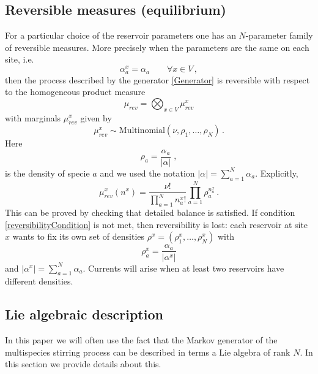 \documentclass[10pt]{article}
\numberwithin{equation}{section}
\numberwithin{equation}{subsection}
\newcommand{\co}{\;,}
\newcommand{\twoj}{\nu}
\begin{document}
\subsection{Reversible measures (equilibrium)}
For a particular choice of the reservoir parameters one has an $N$-parameter family of reversible measures. More precisely
when the parameters are the same on each site, i.e.
\begin{equation}\label{reversibilityCondition}
\alpha_{a}^{x}=\alpha_{a}\qquad \forall x\in V\,,
\end{equation}
then the process described by the generator \eqref{Generator} is reversible with respect to the 
homogeneous product measure 
\begin{equation}
\label{reversibleMeasure}
\mu_{rev}=\bigotimes_{x\in V}\mu_{rev}^{x}
\end{equation}
with marginals $\mu_{rev}^{x}$ given by 
\begin{equation}
 \mu^{x}_{rev}\sim \text{Multinomial}\left(\twoj,\rho_{1},\ldots,\rho_{N}\right)\,.
\end{equation}
Here
 $$
\rho_{a}=\frac{\alpha_{a}}{|\alpha|}\co
$$
is the density of specie $a$ and we used the notation $|\alpha|=\sum_{a=1}^{N}\alpha_{a}$. Explicitly, 
\begin{equation}
\mu_{rev}^{x}(n^{x})=\frac{\nu!}{\prod_{a=1}^{N}n_{a}^{x}!}\prod_{a=1}^{N}\rho_{a}^{n_{a}^{x}}\,.
\end{equation}
This can be proved  by checking that detailed balance is satisfied. 
If condition \eqref{reversibilityCondition} is not met, then reversibility is lost: each reservoir at site $x$ wants to fix its own set of densities $\rho^{x}=(\rho_{1}^{x},\ldots,\rho_{N}^{x})$ with
 $$
\rho_{a}^x=\frac{\alpha_{a}}{|\alpha^x|}
$$
and  $|\alpha^x|=\sum_{a=1}^{N}\alpha_{a}$. 
Currents will arise when at least two reservoirs have different densities. 

\subsection{Lie algebraic description}

In this paper we will often use the fact that the Markov generator of the multispecies stirring process can be described in terms a Lie algebra of rank $N$.
In this section we provide details about this.
\end{document}
